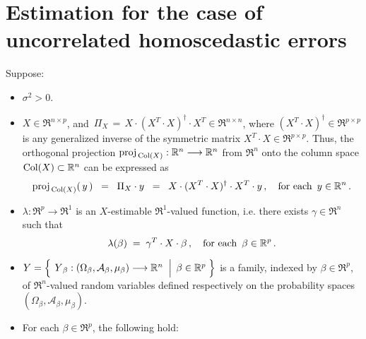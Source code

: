 

\section{Estimation for the case of uncorrelated homoscedastic errors}
\setcounter{theorem}{0}
\setcounter{equation}{0}

\renewcommand{\theenumi}{\roman{enumi}}
\renewcommand{\labelenumi}{\textnormal{(\theenumi)}$\;\;$}


\begin{theorem}
\mbox{}
\vskip 0.1cm
\noindent
Suppose:
\begin{itemize}
\item
	$\sigma^{2} > 0$.
\item
	$X \in \Re^{n \times p}$, and
	\,$\Pi_{X} \,=\, X \cdot (X^{T} \cdot X)^{\dagger} \cdot X^{T} \in \Re^{n \times n}$,
	where $(X^{T} \cdot X)^{\dagger} \in \Re^{p \times p}$
	is any generalized inverse of the symmetric matrix
	$X^{T} \cdot X \in \Re^{p \times p}$.
	Thus, the orthogonal projection $\proj_{\,\Col(X)} : \Re^{n} \longrightarrow \Re^{n}$
	from $\Re^{n}$ onto the column space $\Col(X) \subset \Re^{n}$ can be expressed as
	\begin{equation*}
	\proj_{\,\Col(X)}(\,y\,)
	\;\; = \;\;
		\Pi_{X} \cdot y
	\;\; = \;\;
		X \cdot (X^{T} \cdot X)^{\dagger} \cdot X^{T} \cdot y\,,
	\quad
	\textnormal{for each \,$y \in \Re^{n}$}\,.
	\end{equation*}
\item
	$\lambda : \Re^{p} \longrightarrow \Re^{1}$ is an $X$-estimable $\Re^{1}$-valued function, i.e.
	there exists $\gamma \in \Re^{n}$ such that
	\begin{equation*}
	\lambda(\beta) \; = \; \gamma^{T} \cdot X \cdot \beta\,,
	\quad\textnormal{for each \,$\beta \in \Re^{p}$}\,.
	\end{equation*}
\item
	$Y = \left\{\;
		\left.
		\overset{{\color{white}.}}{Y}_{\beta} : (\Omega_{\beta},\mathcal{A}_{\beta},\mu_{\beta}) \longrightarrow \Re^{n}
		\;\;\right\vert\;
		\beta \in \Re^{p}
		\;\right\}$
	is a family, indexed by $\beta \in \Re^{p}$,
	of $\Re^{n}$-valued random variables defined respectively on the
	probability spaces $(\Omega_{\beta},\mathcal{A}_{\beta},\mu_{\beta})$.
\item
	For each $\beta \in \Re^{p}$, the following hold:

\end{itemize}
\end{theorem}
